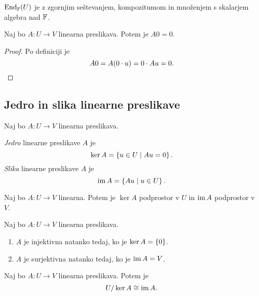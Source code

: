 \documentclass[12pt, a4paper]{article}
\begin{document}
\begin{posledica}
$\text{End}_{\mathbb{F}}(U)$ je z zgornjim seštevanjem, kompozitumom in množenjem s skalarjem algebra nad $\mathbb{F}$.
\end{posledica}

\begin{trditev}
Naj bo $A\colon U\to V$ linearna preslikava. Potem je $A0=0$.
\end{trditev}

\begin{proof}
Po definiciji je
\[
A0=A(0\cdot u)=0\cdot Au=0.\qedhere
\]
\end{proof}

\newpage

\subsection{Jedro in slika linearne preslikave}

\begin{okvir}
\begin{definicija}
Naj bo $A\colon U\to V$ linearna preslikava.

\emph{Jedro} linearne preslikave $A$ je
\[
\ker A=\left\{u\in U\mid Au=0\right\}.
\]
\emph{Slika} linearne preslikave $A$ je
\[
\operatorname{im} A=\left\{Au\mid u\in U\right\}.
\]
\end{definicija}
\end{okvir}

\begin{izrek}
Naj bo $A\colon U\to V$ linearna. Potem je $\ker A$ podprostor v $U$ in $\operatorname{im} A$ podprostor v $V$.
\end{izrek}

\obvs

\begin{trditev}
Naj bo $A\colon U\to V$ linearna preslikava.

\begin{enumerate}[label=\alph*)]
\item $A$ je injektivna natanko tedaj, ko je $\ker A=\left\{0\right\}$.
\item $A$ je surjektivna natanko tedaj, ko je $\operatorname{im} A=V$.
\end{enumerate}
\end{trditev}

\obvs

\begin{izrek}\label{izo1}
Naj bo $A\colon U\to V$ linearna preslikava. Potem je
\[
U/\ker A\cong\operatorname{im} A.
\]
\end{izrek}
\end{document}
